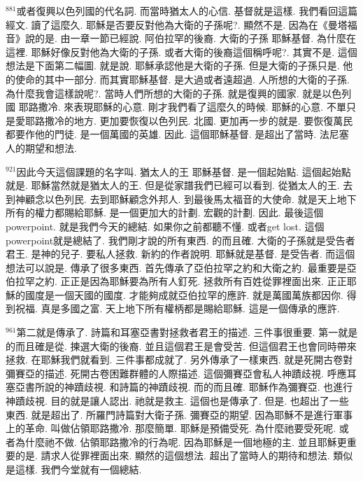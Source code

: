 \documentclass{book}
\begin{document}
$^{881}$或者復興以色列國的代名詞.
而當時猶太人的心信.
基督就是這樣.
我們看回這篇經文.
讀了這麼久.
耶穌是否要反對他為大衛的子孫呢?.
顯然不是.
因為在《曼塔福音》說的是.
由一章一節已經說.
阿伯拉罕的後裔.
大衛的子孫 耶穌基督.
為什麼在這裡.
耶穌好像反對他為大衛的子孫.
或者大衛的後裔這個稱呼呢?.
其實不是.
這個想法是下面第二幅圖.
就是說.
耶穌承認他是大衛的子孫.
但是大衛的子孫只是.
他的使命的其中一部分.
而其實耶穌基督.
是大過或者遠超過.
人所想的大衛的子孫.
為什麼我會這樣說呢?.
當時人們所想的大衛的子孫.
就是復興的國家.
就是以色列國 耶路撒冷.
來表現耶穌的心意.
剛才我們看了這麼久的時候.
耶穌的心意.
不單只是愛耶路撒冷的地方.
更加要恢復以色列民.
北國.
更加再一步的就是.
要恢復萬民都要作他的門徒.
是一個萬國的英雄.
因此.
這個耶穌基督.
是超出了當時.
法尼塞人的期望和想法.

$^{921}$因此今天這個課題的名字叫.
猶太人的王 耶穌基督.
是一個起始點.
這個起始點就是.
耶穌當然就是猶太人的王.
但是從家譜我們已經可以看到.
從猶太人的王.
去到神顧念以色列民.
去到耶穌顧念外邦人.
到最後馬太福音的大使命.
就是天上地下所有的權力都賜給耶穌.
是一個更加大的計劃.
宏觀的計劃.
因此.
最後這個powerpoint.
就是我們今天的總結.
如果你之前都聽不懂.
或者get lost.
這個powerpoint就是總結了.
我們剛才說的所有東西.
的而且確.
大衛的子孫就是受告者君王.
是神的兒子.
要私人拯救.
新約的作者說明.
耶穌就是基督.
是受告者.
而這個想法可以說是.
傳承了很多東西.
首先傳承了亞伯拉罕之約和大衛之約.
最重要是亞伯拉罕之約.
正正是因為耶穌要為所有人釘死.
拯救所有百姓從罪裡面出來.
正正耶穌的國度是一個天國的國度.
才能夠成就亞伯拉罕的應許.
就是萬國萬族都因你.
得到祝福.
真是多國之富.
天上地下所有權柄都是賜給耶穌.
這是一個傳承的應許.

$^{961}$第二就是傳承了.
詩篇和耳塞亞書對拯救者君王的描述.
三件事很重要.
第一就是的而且確是從.
揀選大衛的後裔.
並且這個君王是會受苦.
但這個君王也會同時帶來拯救.
在耶穌我們就看到.
三件事都成就了.
另外傳承了一樣東西.
就是死開古卷對彌賽亞的描述.
死開古卷困難群體的人際描述.
這個彌賽亞會私人神蹟歧視.
呼應耳塞亞書所說的神蹟歧視.
和詩篇的神蹟歧視.
而的而且確.
耶穌作為彌賽亞.
也進行神蹟歧視.
目的就是讓人認出.
祂就是救主.
這個也是傳承了.
但是.
也超出了一些東西.
就是超出了.
所羅門詩篇對大衛子孫.
彌賽亞的期望.
因為耶穌不是進行軍事上的革命.
叫做佔領耶路撒冷.
那麼簡單.
耶穌是預備受死.
為什麼祂要受死呢.
或者為什麼祂不做.
佔領耶路撒冷的行為呢.
因為耶穌是一個地極的主.
並且耶穌更重要的是.
請求人從罪裡面出來.
顯然的這個想法.
超出了當時人的期待和想法.
類似是這樣.
我們今堂就有一個總結.
\end{document}
